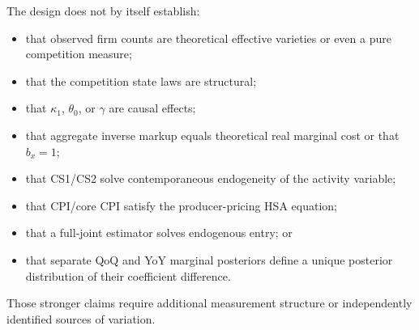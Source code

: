 \documentclass[11pt]{article}
\begin{document}
The design does not by itself establish:
\begin{itemize}
\item that observed firm counts are theoretical effective varieties or even a pure competition measure;
\item that the competition state laws are structural;
\item that $\kappa_1$, $\theta_0$, or $\gamma$ are causal effects;
\item that aggregate inverse markup equals theoretical real marginal cost or that $b_x=1$;
\item that CS1/CS2 solve contemporaneous endogeneity of the activity variable;
\item that CPI/core CPI satisfy the producer-pricing HSA equation;
\item that a full-joint estimator solves endogenous entry; or
\item that separate QoQ and YoY marginal posteriors define a unique posterior distribution of their coefficient difference.
\end{itemize}

Those stronger claims require additional measurement structure or independently identified sources of variation.
\end{document}
